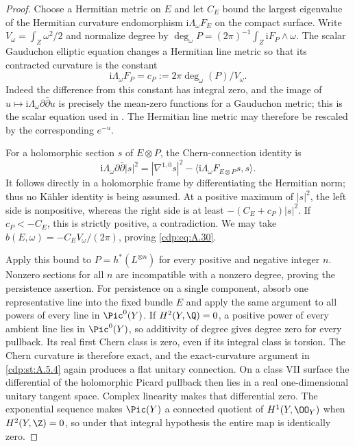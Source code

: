 \begin{proof}
Choose a Hermitian metric on $E$ and let $C_E$ bound the largest eigenvalue of the Hermitian curvature endomorphism $\mathrm i\Lambda_\omega F_E$ on the compact surface. Write $V_\omega=\int_Z\omega^2/2$ and normalize degree by
$\deg_\omega P=(2\pi)^{-1}\int_Z\mathrm iF_P\wedge\omega$.
The scalar Gauduchon elliptic equation changes a Hermitian line metric so that its contracted curvature is the constant
\[
 \mathrm i\Lambda_\omega F_P
       =c_P:=2\pi\deg_\omega(P)/V_\omega.
\]
Indeed the difference from this constant has integral zero, and the image of $u\mapsto\mathrm i\Lambda_\omega\partial\bar\partial u$ is precisely the mean-zero functions for a Gauduchon metric; this is the scalar equation used in \cite[Lemma~2.3]{Teleman2006}. The Hermitian line metric may therefore be rescaled by the corresponding $e^{-u}$.

For a holomorphic section $s$ of $E\otimes P$, the Chern-connection identity is
\[
 \mathrm i\Lambda_\omega\partial\bar\partial|s|^2
 =|\nabla^{1,0}s|^2
  -\langle\mathrm i\Lambda_\omega F_{E\otimes P}s,s\rangle.
\]
It follows directly in a holomorphic frame by differentiating the Hermitian norm; thus no Kähler identity is being assumed. At a positive maximum of $|s|^2$, the left side is nonpositive, whereas the right side is at least
$-(C_E+c_P)|s|^2$.
If $c_P<-C_E$, this is strictly positive, a contradiction. We may take $b(E,\omega)=-C_EV_\omega/(2\pi)$, proving \eqref{cdp:eq:A.30}.

Apply this bound to $P=h^*(L^{\otimes n})$ for every positive and negative integer $n$. Nonzero sections for all $n$ are incompatible with a nonzero degree, proving the persistence assertion. For persistence on a single component, absorb one representative line into the fixed bundle $E$ and apply the same argument to all powers of every line in $\Pic^0(Y)$. If $H^2(Y,\Q)=0$, a positive power of every ambient line lies in $\Pic^0(Y)$, so additivity of degree gives degree zero for every pullback. Its real first Chern class is zero, even if its integral class is torsion. The Chern curvature is therefore exact, and the exact-curvature argument in \ref{cdp:st:A.5.4} again produces a flat unitary connection. On a class VII surface the differential of the holomorphic Picard pullback then lies in a real one-dimensional unitary tangent space. Complex linearity makes that differential zero. The exponential sequence makes $\Pic(Y)$ a connected quotient of $H^1(Y,\OO_Y)$ when $H^2(Y,\Z)=0$, so under that integral hypothesis the entire map is identically zero.
\end{proof}



